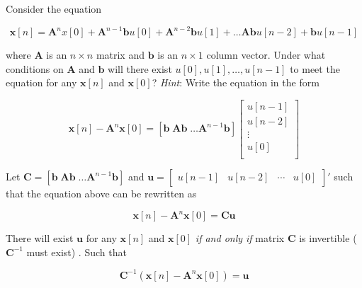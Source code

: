 \item [3.11] Consider the equation

\begin{equation*}
 \mathbf{x}[n] = \mathbf{A}^n x[0] + \mathbf{A}^{n-1} \mathbf{b} u[0]+ \mathbf{A}^{n-2} \mathbf{b} u[1]+ \dots \mathbf{A} \mathbf{b} u[n-2]+ \mathbf{b} u[n-1]
\end{equation*}

where $\mathbf{A}$ is an $n \times n$ matrix and $\mathbf{b}$ is an $n \times 1$ column vector.
Under what conditions on $\mathbf{A}$ and $\mathbf{b}$
will there exist $u[0], u[1], \dots, u[n-1]$ to meet
the equation for any $\mathbf{x}[n]$ and $\mathbf{x}[0]$?
\emph{Hint}: Write the equation in the form

\begin{equation*}
 \mathbf{x}[n] - \mathbf{A}^n \mathbf{x}[0] = [\mathbf{b} \; \mathbf{A}\mathbf{b} \; \dots \mathbf{A}^{n-1}\mathbf{b}]
 \begin{bmatrix}
 u[n-1]\\
 u[n-2]\\
 \vdots \\
 u[0]\\
\end{bmatrix}
\end{equation*}

Let
$\mathbf{C} = [\mathbf{b} \; \mathbf{A}\mathbf{b} \; \dots \mathbf{A}^{n-1}\mathbf{b}]$
and
$\mathbf{u} = \begin{bmatrix}
 u[n-1]&
 u[n-2]&
 \cdots &
 u[0]
\end{bmatrix}'$
such that the equation above can be rewritten as

\begin{equation*}
 \mathbf{x}[n] -  \mathbf{A}^n \mathbf{x}[0] = \mathbf{C} \mathbf{u}
\end{equation*}

There will exist $\mathbf{u}$ for any
$\mathbf{x}[n]$ and $\mathbf{x}[0]$
\emph{if and only if} matrix $\mathbf{C}$ is invertible
($\mathbf{C}^{-1}$ must exist)
.
Such that

\begin{equation*}
 \mathbf{C}^{-1} (\mathbf{x}[n] -  \mathbf{A}^n \mathbf{x}[0]) =  \mathbf{u}
\end{equation*}
